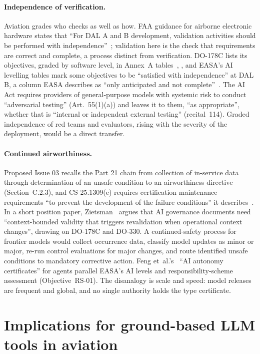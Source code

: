 \documentclass[11pt]{article}
\begin{document}
\paragraph{Independence of verification.} Aviation grades who checks as well as how. FAA guidance for airborne electronic hardware states that ``For DAL A and B development, validation activities should be performed with independence''~\cite[Section~5.5.1]{faa2022ac20152a}; validation here is the check that requirements are correct and complete, a process distinct from verification. DO-178C lists its objectives, graded by software level, in Annex~A tables~\cite{rtca2011do178c}, \cite[para.~6]{faa2017ac20115d}, and EASA's AI levelling tables mark some objectives to be ``satisfied with independence'' at DAL B, a column EASA describes as ``only anticipated and not complete''~\cite[Chapter~D]{easa2026concept}. The AI Act requires providers of general-purpose models with systemic risk to conduct ``adversarial testing'' (Art.~55(1)(a)) and leaves it to them, ``as appropriate'', whether that is ``internal or independent external testing'' (recital~114). Graded independence of red teams and evaluators, rising with the severity of the deployment, would be a direct transfer.

\paragraph{Continued airworthiness.} Proposed Issue 03 recalls the Part 21 chain from collection of in-service data through determination of an unsafe condition to an airworthiness directive (Section~C.2.3), and CS 25.1309(e) requires certification maintenance requirements ``to prevent the development of the failure conditions'' it describes~\cite{easa2020cs25}. In a short position paper, Zietsman~\cite{zietsman2026fifty} argues that AI governance documents need ``context-bounded validity that triggers revalidation when operational context changes'', drawing on DO-178C and DO-330. A continued-safety process for frontier models would collect occurrence data, classify model updates as minor or major, re-run control evaluations for major changes, and route identified unsafe conditions to mandatory corrective action. Feng et~al.'s~\cite{feng2025levels} ``AI autonomy certificates'' for agents parallel EASA's AI levels and responsibility-scheme assessment (Objective~RS-01). The disanalogy is scale and speed: model releases are frequent and global, and no single authority holds the type certificate.

\section{Implications for ground-based LLM tools in aviation}\label{sec:ground}
\end{document}
